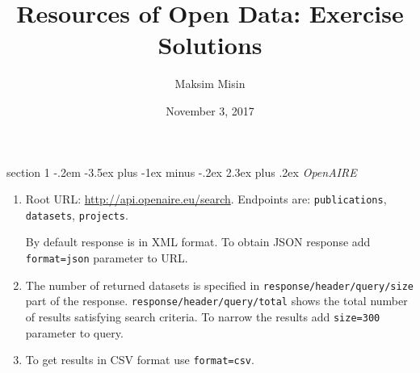 \documentclass[12pt]{article}
\makeatletter
\newenvironment{problem}{\@startsection
	{section}
	{1}
	{-.2em}
	{-3.5ex plus -1ex minus -.2ex}
	{2.3ex plus .2ex}
	{\pagebreak[3]%
		\large\bf\noindent{Exercise }
	}
}
{\vspace{0.8cm}}
\makeatother
\begin{document}
	
	\title{Resources of Open Data: Exercise Solutions}
	\author{Maksim Misin}
	\date{November 3, 2017}
	
	\maketitle
	
	\thispagestyle{empty}
	
	\begin{problem}{\it OpenAIRE}

	
	\begin{enumerate}[label=\textbf{\alph*)},leftmargin=*]
		\item Root URL: \url{http://api.openaire.eu/search}. Endpoints are: \texttt{publications}, \texttt{datasets}, \texttt{projects}.
		
		By default response is in XML format. To obtain JSON response add \texttt{format=json} parameter to URL.
		
		\item The number of returned datasets is specified in \texttt{response/header/query/size} part of the response. \texttt{response/header/query/total} shows the total number of results satisfying search criteria. To narrow the results add \texttt{size=300} parameter to query.
		
		\item To get results in CSV format use \texttt{format=csv}.
		
	\end{enumerate}
		
	\end{problem}
	
\end{document}
